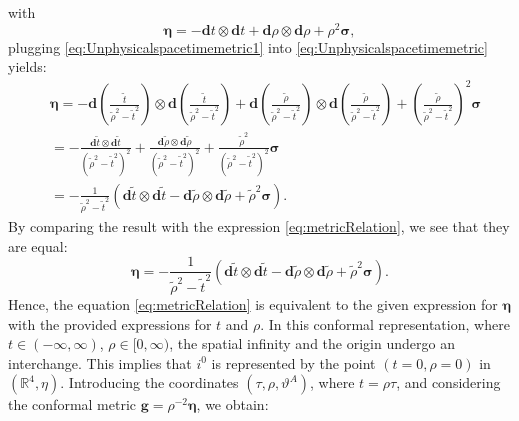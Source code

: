 with
\begin{equation}\label{eq:Unphysicalspacetimemetric1}
  \boldsymbol{\eta}=-\mathbf{d} t \otimes \mathbf{d} t+\mathbf{d} \rho \otimes \mathbf{d} \rho+\rho^2 \boldsymbol{\sigma},
\end{equation}
plugging \eqref{eq:Unphysicalspacetimemetric1} into \eqref{eq:Unphysicalspacetimemetric} yields:
\begin{align}\label{eq:Unphysicalspacetimemetric2}
  & \boldsymbol{\eta} = -\mathbf{d} \left(\frac{\tilde{t}}{\tilde{\rho}^2-\tilde{t}^2}\right) \otimes \mathbf{d} \left(\frac{\tilde{t}}{\tilde{\rho}^2-\tilde{t}^2}\right) + \mathbf{d} \left(\frac{\tilde{\rho}}{\tilde{\rho}^2-\tilde{t}^2}\right) \otimes \mathbf{d} \left(\frac{\tilde{\rho}}{\tilde{\rho}^2-\tilde{t}^2}\right) + \left(\frac{\tilde{\rho}}{\tilde{\rho}^2-\tilde{t}^2}\right)^2 \boldsymbol{\sigma} \nonumber \\
  & = -\frac{\mathbf{d} \tilde{t} \otimes \mathbf{d} \tilde{t}}{(\tilde{\rho}^2-\tilde{t}^2)^2}+\frac{\mathbf{d} \tilde{\rho} \otimes \mathbf{d} \tilde{\rho}}{(\tilde{\rho}^2-\tilde{t}^2)^2}+\frac{\tilde{\rho}^2}{(\tilde{\rho}^2-\tilde{t}^2)^2} \boldsymbol{\sigma} \nonumber \\
  & = -\frac{1}{\tilde{\rho}^2-\tilde{t}^2} (\mathbf{d} \tilde{t} \otimes \mathbf{d} \tilde{t}-\mathbf{d} \tilde{\rho} \otimes \mathbf{d} \tilde{\rho}+\tilde{\rho}^2 \boldsymbol{\sigma}).
\end{align}
By comparing the result with the expression \eqref{eq:metricRelation}, we see that they are equal:
\begin{equation}\label{eq:UnphysicalMetricFinal}
  \boldsymbol{\eta} = -\frac{1}{\tilde{\rho}^2-\tilde{t}^2} (\mathbf{d} \tilde{t} \otimes \mathbf{d} \tilde{t}-\mathbf{d} \tilde{\rho} \otimes \mathbf{d} \tilde{\rho}+\tilde{\rho}^2 \boldsymbol{\sigma}).
\end{equation}
Hence, the equation \eqref{eq:metricRelation} is equivalent to the given expression for \(\boldsymbol{\eta}\) with the provided expressions for \(t\) and \(\rho\).
In this conformal representation, where $t \in (-\infty, \infty)$, $\rho \in [0, \infty)$, the spatial infinity and the origin undergo an interchange. This implies that $i^0$ is represented by the point $(t = 0, \rho = 0)$ in $(\mathbb{R}^4, \eta)$. Introducing the coordinates $(\tau, \rho, \vartheta^A)$, where $t = \rho \tau$, and considering the conformal metric $\boldsymbol{g} = \rho^{-2} \boldsymbol{\eta}$, we obtain:
